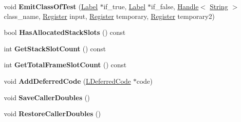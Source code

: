 \begin{DoxyCompactItemize}
\item 
void {\bfseries Emit\+Class\+Of\+Test} (\hyperlink{classv8_1_1internal_1_1_label}{Label} $\ast$if\+\_\+true, \hyperlink{classv8_1_1internal_1_1_label}{Label} $\ast$if\+\_\+false, \hyperlink{classv8_1_1internal_1_1_handle}{Handle}$<$ \hyperlink{classv8_1_1internal_1_1_string}{String} $>$ class\+\_\+name, \hyperlink{structv8_1_1internal_1_1_register}{Register} input, \hyperlink{structv8_1_1internal_1_1_register}{Register} temporary, \hyperlink{structv8_1_1internal_1_1_register}{Register} temporary2)\hypertarget{classv8_1_1internal_1_1_l_code_gen_aae86e9c7161b47dc83e86e0ef0402a43}{}\label{classv8_1_1internal_1_1_l_code_gen_aae86e9c7161b47dc83e86e0ef0402a43}

\item 
bool {\bfseries Has\+Allocated\+Stack\+Slots} () const \hypertarget{classv8_1_1internal_1_1_l_code_gen_a6a5091a94d97298722ad3509d6fa41ab}{}\label{classv8_1_1internal_1_1_l_code_gen_a6a5091a94d97298722ad3509d6fa41ab}

\item 
int {\bfseries Get\+Stack\+Slot\+Count} () const \hypertarget{classv8_1_1internal_1_1_l_code_gen_ae997141e779eee569145e6d5f4326745}{}\label{classv8_1_1internal_1_1_l_code_gen_ae997141e779eee569145e6d5f4326745}

\item 
int {\bfseries Get\+Total\+Frame\+Slot\+Count} () const \hypertarget{classv8_1_1internal_1_1_l_code_gen_a7e0a34008896a2d4d09dab6f216df9cc}{}\label{classv8_1_1internal_1_1_l_code_gen_a7e0a34008896a2d4d09dab6f216df9cc}

\item 
void {\bfseries Add\+Deferred\+Code} (\hyperlink{classv8_1_1internal_1_1_l_deferred_code}{L\+Deferred\+Code} $\ast$code)\hypertarget{classv8_1_1internal_1_1_l_code_gen_a136807d3acd05ca71821c19ab49ef581}{}\label{classv8_1_1internal_1_1_l_code_gen_a136807d3acd05ca71821c19ab49ef581}

\item 
void {\bfseries Save\+Caller\+Doubles} ()\hypertarget{classv8_1_1internal_1_1_l_code_gen_a668f6d1f7c5aaf43fbfce22898808064}{}\label{classv8_1_1internal_1_1_l_code_gen_a668f6d1f7c5aaf43fbfce22898808064}

\item 
void {\bfseries Restore\+Caller\+Doubles} ()\hypertarget{classv8_1_1internal_1_1_l_code_gen_a094ae8da5b8b7b7d12990d25a4db2272}{}\label{classv8_1_1internal_1_1_l_code_gen_a094ae8da5b8b7b7d12990d25a4db2272}


\end{DoxyCompactItemize}
